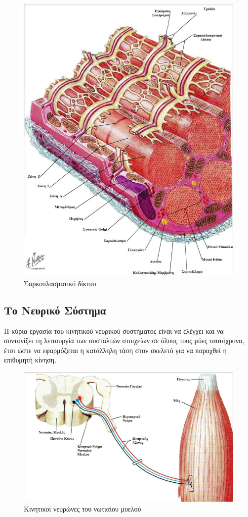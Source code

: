 \begin{figure}[H]
    \centering
    \includegraphics[width=.7\textwidth, height=0.6\textheight, keepaspectratio]{fig/muscle-fysiology3.png}
    \caption{Σαρκοπλασματικό δίκτυο\protect\footnotemark}
    \label{fig:muscle-fysiology3}
\end{figure}

\subsection{Το Νευρικό Σύστημα}

Η κύρια εργασία του κινητικού νευρικού συστήματος είναι να ελέγχει και να συντονίζει τη λειτουργία των συσταλτών στοιχείων σε όλους τους μύες ταυτόχρονα, έτσι ώστε να εφαρμόζεται η κατάλληλη τάση στον σκελετό για να παραχθεί η επιθυμητή κίνηση.

\begin{figure}[H]
    \centering
    \includegraphics[width=.8\textwidth, keepaspectratio]{fig/muscle-fysiology4.png}
    \caption{Κινητικοί νευρώνες του νωτιαίου μυελού\protect\footnotemark}
    \label{fig:muscle-fysiology4}
\end{figure}

